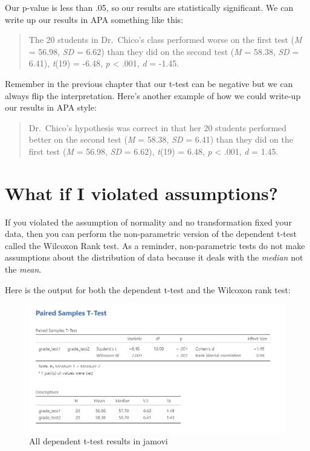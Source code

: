 \documentclass[
]{book}
\begin{document}
Our p-value is less than .05, so our results are statistically significant. We can write up our results in APA something like this:

\begin{quote}
The 20 students in Dr.~Chico's class performed worse on the first test (\emph{M} = 56.98, \emph{SD} = 6.62) than they did on the second test (\emph{M} = 58.38, \emph{SD} = 6.41), \emph{t}(19) = -6.48, \emph{p} \textless{} .001, \emph{d} = -1.45.
\end{quote}

Remember in the previous chapter that our t-test can be negative but we can always flip the interpretation. Here's another example of how we could write-up our results in APA style:

\begin{quote}
Dr.~Chico's hypothesis was correct in that her 20 students performed better on the second test (\emph{M} = 58.38, \emph{SD} = 6.41) than they did on the first test (\emph{M} = 56.98, \emph{SD} = 6.62), \emph{t}(19) = 6.48, \emph{p} \textless{} .001, \emph{d} = 1.45.
\end{quote}

\hypertarget{what-if-i-violated-assumptions-1}{%
\section{What if I violated assumptions?}\label{what-if-i-violated-assumptions-1}}

If you violated the assumption of normality and no transformation fixed your data, then you can perform the non-parametric version of the dependent t-test called the Wilcoxon Rank test. As a reminder, non-parametric tests do not make assumptions about the distribution of data because it deals with the \emph{median} not the \emph{mean}.

Here is the output for both the dependent t-test and the Wilcoxon rank test:

\begin{figure}

{\centering \includegraphics[width=1\linewidth]{images/03_dependent_t-test/dependent_results_full} 

}

\caption{All dependent t-test results in jamovi}\label{fig:unnamed-chunk-4}
\end{figure}
\end{document}
